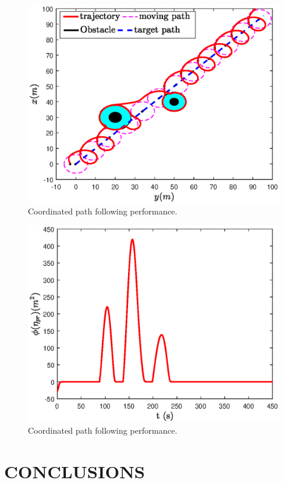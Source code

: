 \documentclass[a4paper, 10pt, conference]{ieeeconf}      %
\begin{document}
\begin{figure}[!htb]
	\centering
	\includegraphics[width=\hsize]{case2_map.eps}
	\caption{Coordinated path following performance.}
	\label{fig5}
\end{figure}

\begin{figure}[!htb]
	\centering
	\includegraphics[width=\hsize]{case2_error.eps}
	\caption{Coordinated path following performance.}
	\label{fig6}
\end{figure}

\section{CONCLUSIONS}
\end{document}
